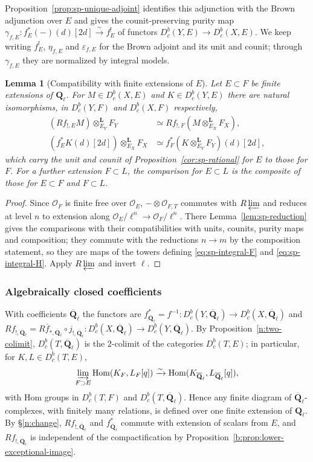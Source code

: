 \documentclass[11pt,a4paper]{article}
\numberwithin{equation}{section}
\newtheorem{lemma}[theorem]{Lemma}
\theoremstyle{definition}
\theoremstyle{remark}
\newcommand{\Dbc}{D^b_c}
\newcommand{\Qbar}{\overline{\mathbf Q}_\ell}
\newcommand{\Ql}{\mathbf Q_\ell}
\newcommand{\Hom}{\operatorname{Hom}}
\begin{document}
Proposition~\ref{prop:sp-unique-adjoint} identifies this adjunction
with the Brown adjunction over $E$ and gives the counit-preserving purity
map $\gamma_{f,E}:f_E^*(-)(d)[2d]\xrightarrow{\sim}f_E^!$ of functors
$\Dbc(Y,E)\to\Dbc(X,E)$.
We keep writing $f_E^!$, $\eta_{f,E}$ and $\varepsilon_{f,E}$ for the
Brown adjoint and its unit and counit; through $\gamma_{f,E}$ they are
normalized by integral models.

\begin{lemma}[Compatibility with finite extensions of $E$]
\label{lem:sp-field-extension}
Let $E\subset F$ be finite extensions of $\Ql$. For $M\in\Dbc(X,E)$ and
$K\in\Dbc(Y,E)$ there are natural isomorphisms, in $\Dbc(Y,F)$ and
$\Dbc(X,F)$ respectively,
\[
\begin{aligned}
 (Rf_{!,E}M)\otimes^{\mathbf L}_{E_Y}F_Y
       &\simeq Rf_{!,F}(M\otimes^{\mathbf L}_{E_X}F_X),\\
 (f_E^*K(d)[2d])\otimes^{\mathbf L}_{E_X}F_X
       &\simeq f_F^*(K\otimes^{\mathbf L}_{E_Y}F_Y)(d)[2d],
\end{aligned}
\]
which carry the unit and counit of Proposition~\ref{cor:sp-rational} for
$E$ to those for $F$. For a further extension $F\subset L$, the
comparison for $E\subset L$ is the composite of those for $E\subset F$
and $F\subset L$.
\end{lemma}
\begin{proof}
Since $\mathcal O_F$ is finite free over $\mathcal O_E$,
$-\otimes\mathcal O_{F,T}$ commutes with $R\varprojlim$ and reduces at
level $n$ to extension along $\mathcal O_E/\ell^n\to\mathcal O_F/\ell^n$.
There Lemma~\ref{lem:sp-reduction} gives the comparisons with their
compatibilities with units, counits, purity maps and composition; they
commute with the reductions $n\to m$ by the composition statement, so
they are maps of the towers defining \eqref{eq:sp-integral-F} and
\eqref{eq:sp-integral-H}. Apply $R\varprojlim$ and invert $\ell$.
\end{proof}

\subsubsection{Algebraically closed coefficients}

With coefficients $\Qbar$ the functors are
$f_{\Qbar}^*=f^{-1}\colon\Dbc(Y,\Qbar)\to\Dbc(X,\Qbar)$ and
$Rf_{!,\Qbar}=R\bar f_{*,\Qbar}\circ j_{!,\Qbar}\colon\Dbc(X,\Qbar)\to\Dbc(Y,\Qbar)$. By
Proposition~\ref{n:two-colimit}, $\Dbc(T,\Qbar)$ is the $2$-colimit of the
categories $\Dbc(T,E)$; in particular, for $K,L\in\Dbc(T,E)$,
\begin{equation}\label{eq:sp-qbar-Hom}
 \varinjlim_{F\supset E}\Hom(K_F,L_F[q])
 \xrightarrow{\sim}\Hom(K_{\Qbar},L_{\Qbar}[q]),
\end{equation}
with Hom groups in $\Dbc(T,F)$ and $\Dbc(T,\Qbar)$. Hence any finite
diagram of $\Qbar$-complexes, with finitely many relations, is defined
over one finite extension of $\Ql$. By \S\ref{n:change},
$Rf_{!,\Qbar}$ and $f^*_{\Qbar}$ commute with extension of scalars from
$E$, and $Rf_{!,\Qbar}$ is independent of the compactification by
Proposition~\ref{b:prop:lower-exceptional-image}.
\end{document}
